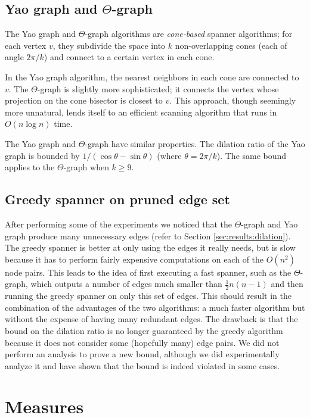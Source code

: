 \documentclass[a4paper,twoside,11pt,hidelinks]{article}
\theoremstyle{plain}
\theoremstyle{definition}  %
\begin{document}
\subsection{Yao graph and \texorpdfstring{$\Theta$}{Theta}-graph}

The Yao graph \cite{yao1982constructing} and $\Theta$-graph \cite{clarkson1987approximation} algorithms are \emph{cone-based} spanner algorithms; for each vertex $v$, they subdivide the space into $k$ non-overlapping cones (each of angle $2 \pi / k$) and connect to a certain vertex in each cone.

In the Yao graph algorithm, the nearest neighbors in each cone are connected to $v$. The $\Theta$-graph is slightly more sophisticated; it connects the vertex whose projection on the cone bisector is closest to $v$. This approach, though seemingly more unnatural, lends itself to an efficient scanning algorithm that runs in $O(n \log n)$ time. 

The Yao graph and $\Theta$-graph have similar properties. The dilation ratio of the Yao graph is bounded by $1 / (\cos \theta - \sin \theta)$ (where $\theta = 2 \pi / k$). The same bound applies to the $\Theta$-graph when $k \ge 9$.

\subsection{Greedy spanner on pruned edge set}

After performing some of the experiments we noticed that the $\Theta$-graph and Yao graph produce many unnecessary edges (refer to Section \ref{sec:results:dilation}). The greedy spanner is better at only using the edges it really needs, but is slow because it has to perform fairly expensive computations on each of the $O(n^2)$ node pairs. This leads to the idea of first executing a fast spanner, such as the $\Theta$-graph, which outputs a number of edges much smaller than $\frac{1}{2}n(n-1)$ and then running the greedy spanner on only this set of edges. This should result in the combination of the advantages of the two algorithms: a much faster algorithm but without the expense of having many redundant edges. The drawback is that the bound on the dilation ratio is no longer guaranteed by the greedy algorithm because it does not consider some (hopefully many) edge pairs. We did not perform an analysis to prove a new bound, although we did experimentally analyze it and have shown that the bound is indeed violated in some cases.

\section{Measures}
\label{sec:measures}
\end{document}
